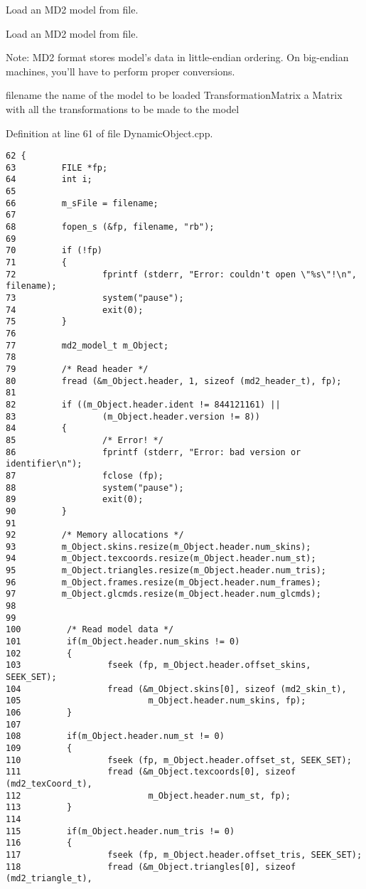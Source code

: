 Load an MD2 model from file. 

Load an MD2 model from file.

Note: MD2 format stores model's data in little-endian ordering. On big-endian machines, you'll have to perform proper conversions.

filename the name of the model to be loaded  TransformationMatrix a Matrix with all the transformations to be made to the model 

Definition at line 61 of file DynamicObject.cpp.

\begin{Code}\begin{verbatim}62 {
63         FILE *fp;
64         int i;
65 
66         m_sFile = filename;
67 
68         fopen_s (&fp, filename, "rb");
69         
70         if (!fp)
71         {
72                 fprintf (stderr, "Error: couldn't open \"%s\"!\n", filename);
73                 system("pause");
74                 exit(0);
75         }
76 
77         md2_model_t m_Object;
78 
79         /* Read header */
80         fread (&m_Object.header, 1, sizeof (md2_header_t), fp);
81 
82         if ((m_Object.header.ident != 844121161) ||
83                 (m_Object.header.version != 8))
84         {
85                 /* Error! */
86                 fprintf (stderr, "Error: bad version or identifier\n");
87                 fclose (fp);
88                 system("pause");
89                 exit(0);
90         }
91 
92         /* Memory allocations */
93         m_Object.skins.resize(m_Object.header.num_skins);
94         m_Object.texcoords.resize(m_Object.header.num_st);
95         m_Object.triangles.resize(m_Object.header.num_tris);
96         m_Object.frames.resize(m_Object.header.num_frames);
97         m_Object.glcmds.resize(m_Object.header.num_glcmds);
98 
99 
100         /* Read model data */
101         if(m_Object.header.num_skins != 0)
102         {
103                 fseek (fp, m_Object.header.offset_skins, SEEK_SET);
104                 fread (&m_Object.skins[0], sizeof (md2_skin_t),
105                         m_Object.header.num_skins, fp);
106         }
107 
108         if(m_Object.header.num_st != 0)
109         {
110                 fseek (fp, m_Object.header.offset_st, SEEK_SET);
111                 fread (&m_Object.texcoords[0], sizeof (md2_texCoord_t),
112                         m_Object.header.num_st, fp);
113         }
114 
115         if(m_Object.header.num_tris != 0)
116         {
117                 fseek (fp, m_Object.header.offset_tris, SEEK_SET);
118                 fread (&m_Object.triangles[0], sizeof (md2_triangle_t),

\end{verbatim}
\end{Code}
